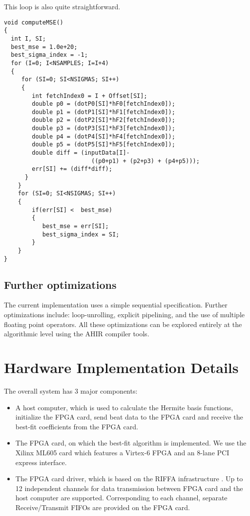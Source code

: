 \documentclass[runningheads]{llncs}
\begin{document}
This loop is also quite straightforward.
\begin{verbatim}
void computeMSE()
{
  int I, SI;
  best_mse = 1.0e+20;
  best_sigma_index = -1;
  for (I=0; I<NSAMPLES; I=I+4)
  {
     for (SI=0; SI<NSIGMAS; SI++)
     {
        int fetchIndex0 = I + Offset[SI]; 
        double p0 = (dotP0[SI]*hF0[fetchIndex0]);
        double p1 = (dotP1[SI]*hF1[fetchIndex0]);
        double p2 = (dotP2[SI]*hF2[fetchIndex0]);
        double p3 = (dotP3[SI]*hF3[fetchIndex0]);
        double p4 = (dotP4[SI]*hF4[fetchIndex0]);
        double p5 = (dotP5[SI]*hF5[fetchIndex0]);
        double diff = (inputData[I]-
                         ((p0+p1) + (p2+p3) + (p4+p5)));
        err[SI] += (diff*diff);
      }
    }
    for (SI=0; SI<NSIGMAS; SI++)
    {
        if(err[SI] <  best_mse)
        {
           best_mse = err[SI];
           best_sigma_index = SI;
        }
    }
}
\end{verbatim}


\subsection{Further optimizations}

The current implementation uses a simple sequential specification.
Further optimizations include: loop-unrolling, explicit pipelining,
and the use of multiple floating point operators.  All these optimizations
can be explored entirely at the algorithmic level using the AHIR
compiler tools.

\section{Hardware Implementation Details}\label{s:implementation}

The overall system has 3 major components:
\begin{itemize}
\item A host computer, which is used to calculate the Hermite basis functions,
initialize the FPGA card, send beat data to the FPGA card and receive
the best-fit coefficients from the FPGA card.
\item The FPGA card, on which the best-fit algorithm is implemented.   We use the
Xilinx ML605 card which features a Virtex-6 FPGA and an 8-lane PCI express interface.
\item The FPGA card driver, which is based on the RIFFA infrastructure \cite{c:jacobsen13}. 
Up to 12 independent channels for data transmission between FPGA card and the host
computer are supported. Corresponding to each channel, separate Receive/Transmit FIFOs
are provided on the FPGA card. 
\end{itemize}
\end{document}
